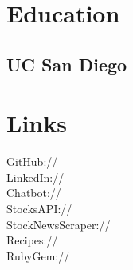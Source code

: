 \documentclass[]{deedy-resume-openfont}
\begin{document}
%
%
\lastupdated

%
%



%
%

\begin{minipage}[t]{0.33\textwidth}


\section{Education}

\subsection{UC San Diego}
\sectionsep


\section{Links}
GitHub://\href{https://github.com/jonwho}{} \\
LinkedIn://\href{https://www.linkedin.com/in/jonwho}{} \\
Chatbot://\href{https://github.com/jonwho/discord-bot}{} \\
StocksAPI://\href{https://github.com/jonwho/go-iex}{} \\
StockNewsScraper://\href{https://github.com/jonwho/dd}{} \\
Recipes://\href{https://github.com/recipey}{} \\
RubyGem://\href{https://github.com/jonwho/lolxin}{}
\sectionsep


\end{minipage}
\end{document}
